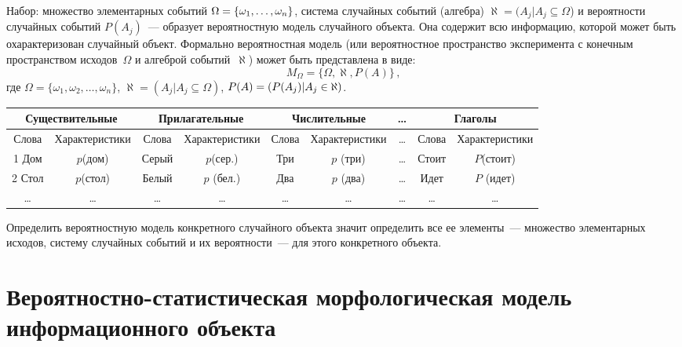 \begin{multicols}{2}
   Набор: множество элементарных событий $\Omega \hm=\{\omega_1, \ldots , 
\omega_n\}$, система случайных событий (ал\-геб\-ра) $\aleph=(A_j\vert  
A_j\subseteq\Omega$) и вероятности случайных событий $P(A_j)$~--- образует 
вероятностную модель случайного объекта. Она содержит всю информацию, 
которой может быть охарактеризован случайный объект. Формально 
вероятностная модель (или вероятностное пространство эксперимента с 
конечным пространством исходов~$\Omega$ и алгеброй событий~$\aleph$) 
может быть представлена в виде:
   \begin{equation}
   M_\Omega =\{ \Omega, \aleph, P(A)\}\,,
   \label{e5-k}
   \end{equation}
где $\Omega= \{\omega_1, \omega_2, \ldots , \omega_n\}$, $\aleph= (A_j\vert A_j 
\subseteq \Omega)$, $P(A) \hm= (P(A_j)\vert A_j\in \aleph)$.

\begin{table*}[b]\small
\begin{center}
\vspace*{2ex}

\tabcolsep=4.5pt
\begin{tabular}{|c|c|c|c|c|c|c|c|c|}
\hline
\multicolumn{2}{|c|}{Существительные}&\multicolumn{2}{c|}{Прилагательные}&
\multicolumn{2}{c|}{Числительные}&\ldots&\multicolumn{2}{c|}{Глаголы}\\
\hline
Слова&Характеристики&Слова&Характеристики&Слова&Характеристики&\ldots&Слова&Характеристики\\
\hline
1 Дом&$p$(дом)&Серый&$p$(сер.)&Три&$p$ (три)&\ldots&Стоит&$P$(стоит)\\
2 Стол&$p$(стол)&Белый&$p$ (бел.)&Два&$p$ (два)&\ldots&Идет&$P$ (идет)\\
\ldots&\ldots&\ldots&\ldots&\ldots&\ldots&\ldots&\ldots&\ldots\\
\hline
\end{tabular}
\end{center}
\end{table*}
   
   Определить вероятностную модель конкретного случайного объекта 
значит определить все ее элементы~--- множество элементарных исходов, 
сис\-те\-му случайных событий и их вероятности~--- для этого конкретного 
объекта.

\section{Вероятностно-статистическая морфологическая модель 
информационного объекта}
   

\end{multicols}
